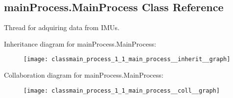 \hypertarget{classmain_process_1_1_main_process}{\subsection{main\-Process.\-Main\-Process Class Reference}
\label{classmain_process_1_1_main_process}
}


Thread for adquiring data from I\-M\-Us.  




Inheritance diagram for main\-Process.\-Main\-Process\-:
\nopagebreak
\begin{figure}[H]
\begin{center}
\leavevmode
\texttt{[image: classmain\_process\_1\_1\_main\_process\_\_inherit\_\_graph]}
\end{center}
\end{figure}


Collaboration diagram for main\-Process.\-Main\-Process\-:
\nopagebreak
\begin{figure}[H]
\begin{center}
\leavevmode
\texttt{[image: classmain\_process\_1\_1\_main\_process\_\_coll\_\_graph]}
\end{center}
\end{figure}
